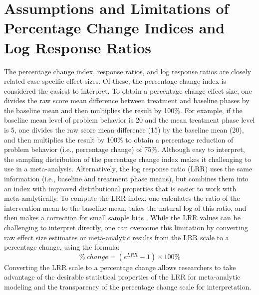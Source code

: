 \documentclass[
]{book}
\begin{document}
\hypertarget{assumptions-and-limitations-of-percentage-change-indices-and-log-response-ratios}{%
\section{Assumptions and Limitations of Percentage Change Indices and Log Response Ratios}\label{assumptions-and-limitations-of-percentage-change-indices-and-log-response-ratios}}

The percentage change index, response ratios, and log response ratios are closely related case-specific effect sizes. Of these, the percentage change index \citep{hershberger1999meta} is considered the easiest to interpret. To obtain a percentage change effect size, one divides the raw score mean difference between treatment and baseline phases by the baseline mean and then multiplies the result by 100\(\%\).
For example, if the baseline mean level of problem behavior is 20 and the mean treatment phase level is 5, one divides the raw score mean difference (15) by the baseline mean (20), and then multiplies the result by 100\(\%\) to obtain a percentage reduction of problem behavior (i.e., percentage change) of 75\(\%\). Although easy to interpret, the sampling distribution of the percentage change index makes it challenging to use in a meta-analysis. Alternatively, the log response ratio (LRR) uses the same information (i.e., baseline and treatment phase means), but combines them into an index with improved distributional properties that is easier to work with meta-analytically. To compute the LRR index, one calculates the ratio of the intervention mean to the baseline mean, takes the natural log of this ratio, and then makes a correction for small sample bias \citep{pustejovsky2018Using}. While the LRR values can be challenging to interpret directly, one can overcome this limitation by converting raw effect size estimates or meta-analytic results from the LRR scale to a percentage change, using the formula:
\begin{equation}
\label{eq:LRRtoPctC}
\% \ change= (e^{LRR}-1) \times 100 \%
\end{equation}
Converting the LRR scale to a percentage change allows researchers to take advantage of the desirable statistical properties of the LRR for meta-analytic modeling and the transparency of the percentage change scale for interpretation.
\end{document}
